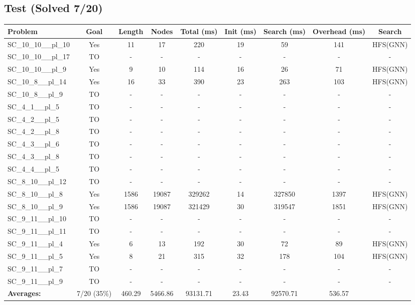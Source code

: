 \documentclass{article}
\begin{document}
\subsection*{Test (Solved 7/20)}
\begin{tabular}{lcccccccc}
\toprule
Problem & Goal & Length & Nodes & Total (ms) & Init (ms) & Search (ms) & Overhead (ms) & Search \\
\midrule
SC\_10\_10\_\_pl\_10 & Yes & 11 & 17 & 220 & 19 & 59 & 141 & HFS(GNN) \\
SC\_10\_10\_\_pl\_17 & TO & - & - & - & - & - & - & - \\
SC\_10\_10\_\_pl\_9 & Yes & 9 & 10 & 114 & 16 & 26 & 71 & HFS(GNN) \\
SC\_10\_8\_\_pl\_14 & Yes & 16 & 33 & 390 & 23 & 263 & 103 & HFS(GNN) \\
SC\_10\_8\_\_pl\_9 & TO & - & - & - & - & - & - & - \\
SC\_4\_1\_\_pl\_5 & TO & - & - & - & - & - & - & - \\
SC\_4\_2\_\_pl\_5 & TO & - & - & - & - & - & - & - \\
SC\_4\_2\_\_pl\_8 & TO & - & - & - & - & - & - & - \\
SC\_4\_3\_\_pl\_6 & TO & - & - & - & - & - & - & - \\
SC\_4\_3\_\_pl\_8 & TO & - & - & - & - & - & - & - \\
SC\_4\_4\_\_pl\_5 & TO & - & - & - & - & - & - & - \\
SC\_8\_10\_\_pl\_12 & TO & - & - & - & - & - & - & - \\
SC\_8\_10\_\_pl\_8 & Yes & 1586 & 19087 & 329262 & 14 & 327850 & 1397 & HFS(GNN) \\
SC\_8\_10\_\_pl\_9 & Yes & 1586 & 19087 & 321429 & 30 & 319547 & 1851 & HFS(GNN) \\
SC\_9\_11\_\_pl\_10 & TO & - & - & - & - & - & - & - \\
SC\_9\_11\_\_pl\_11 & TO & - & - & - & - & - & - & - \\
SC\_9\_11\_\_pl\_4 & Yes & 6 & 13 & 192 & 30 & 72 & 89 & HFS(GNN) \\
SC\_9\_11\_\_pl\_5 & Yes & 8 & 21 & 315 & 32 & 178 & 104 & HFS(GNN) \\
SC\_9\_11\_\_pl\_7 & TO & - & - & - & - & - & - & - \\
SC\_9\_11\_\_pl\_9 & TO & - & - & - & - & - & - & - \\
\textbf{Averages:} & 7/20 (35\%) & 460.29 & 5466.86 & 93131.71 & 23.43 & 92570.71 & 536.57 & \\
\bottomrule
\end{tabular}
\\[0.7cm]
\end{document}

